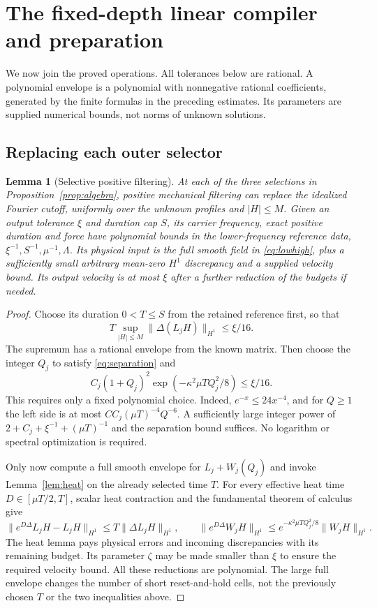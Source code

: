 \documentclass[11pt,a4paper]{amsart}
\newtheorem{lemma}[theorem]{Lemma}
\theoremstyle{definition}
\theoremstyle{remark}
\numberwithin{equation}{section}
\newcommand{\norm}[1]{\lVert #1\rVert}
\begin{document}
\section{The fixed-depth linear compiler and preparation}\label{sec:compiler}
We now join the proved operations. All tolerances below are rational.
A polynomial envelope is a polynomial with nonnegative rational coefficients,
generated by the finite formulas in the preceding estimates. Its parameters
are supplied numerical bounds, not norms of unknown solutions.

\subsection{Replacing each outer selector}
\begin{lemma}[Selective positive filtering]\label{lem:selective}
At each of the three selections in Proposition~\ref{prop:algebra}, positive
mechanical filtering can replace the idealized Fourier cutoff, uniformly over
the unknown profiles and $|H|\le M$. Given an output tolerance $\xi$ and
duration cap $S$, its carrier frequency, exact positive duration and force
have polynomial bounds in the lower-frequency reference data,
$\xi^{-1},S^{-1},\mu^{-1},\Lambda$. Its physical input is the full smooth
field in \eqref{eq:lowhigh}, plus a sufficiently small arbitrary mean-zero
$H^1$ discrepancy and a supplied velocity bound. Its output velocity is
at most $\xi$ after a further reduction of the budgets if needed.
\end{lemma}
\begin{proof}
Choose its duration $0<T\le S$ from the retained reference first, so that
\begin{equation}\label{eq:lowbias}
 T\sup_{|H|\le M}\norm{\Delta(L_jH)}_{H^1}\le\xi/16.
\end{equation}
The supremum has a rational envelope from the known matrix. Then choose
the integer $Q_j$ to satisfy \eqref{eq:separation} and
\begin{equation}\label{eq:highdamping}
 C_j(1+Q_j)^2\exp(-\kappa^2\mu TQ_j^2/8)\le\xi/16.
\end{equation}
This requires only a fixed polynomial choice. Indeed,
$e^{-x}\le24x^{-4}$, and for $Q\ge1$ the left side is at most
$C C_j(\mu T)^{-4}Q^{-6}$. A sufficiently large integer power of
$2+C_j+\xi^{-1}+(\mu T)^{-1}$ and the separation bound suffices.
No logarithm or spectral optimization is required.

Only now compute a full smooth envelope for $L_j+W_j(Q_j)$ and invoke
Lemma~\ref{lem:heat} on the already selected time $T$. For every effective
heat time $D\in[\mu T/2,T]$, scalar heat contraction and the fundamental
theorem of calculus give
\[
 \norm{e^{D\Delta}L_jH-L_jH}_{H^1}\le T\norm{\Delta L_jH}_{H^1},\qquad
 \norm{e^{D\Delta}W_jH}_{H^1}
 \le e^{-\kappa^2\mu TQ_j^2/8}\norm{W_jH}_{H^1}.
\]
The heat lemma pays physical errors and incoming discrepancies with its
remaining budget. Its parameter $\zeta$ may be made smaller than $\xi$ to
ensure the required velocity bound. All these reductions are polynomial.
The large full envelope changes the number of short reset-and-hold cells,
not the previously chosen $T$ or the two inequalities above.
\end{proof}
\end{document}
